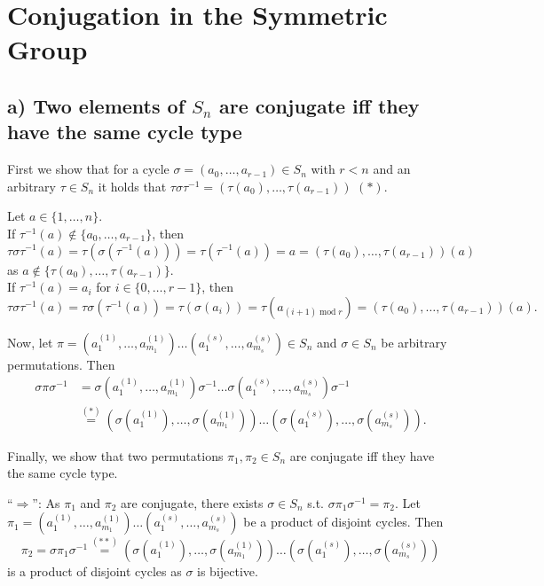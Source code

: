 \section{Conjugation in the Symmetric Group}

\subsection*{a) Two elements of $S_n$ are conjugate iff they have the same cycle type}
First we show that for a cycle $\sigma = (a_0, \dots, a_{r-1}) \in S_n$ with $r < n$ and an arbitrary $\tau \in S_n$ it holds that $\tau \sigma \tau^{-1} = (\tau(a_0), \dots, \tau(a_{r-1}))$ $(\ast)$.

Let $a \in \{1, \dots, n\}$.\\
If $\tau^{-1}(a) \notin \{a_0, \dots, a_{r-1}\}$, then 
\[ \tau \sigma \tau^{-1}(a) = \tau(\sigma (\tau^{-1}(a))) = \tau(\tau^{-1}(a)) = a = (\tau(a_0), \dots, \tau(a_{r-1}))(a) \] 
as $a \notin \{\tau(a_0), \dots, \tau(a_{r-1})\}$.\\
If $\tau^{-1}(a) = a_i$ for $i \in \{0, \dots, r-1\}$, then
\[ \tau \sigma \tau^{-1}(a) = \tau \sigma(\tau^{-1}(a)) = \tau(\sigma(a_i)) = \tau(a_{(i+1) \operatorname{mod} r}) = (\tau(a_0), \dots, \tau(a_{r-1}))(a). \]

Now, let $\pi = (a_1^{(1)}, \dots, a_{m_1}^{(1)}) \dots (a_1^{(s)}, \dots, a_{m_s}^{(s)}) \in S_n$ and $\sigma \in S_n$ be arbitrary permutations. Then
\begin{equation} \tag{$\ast \ast$}
\begin{split}
\sigma \pi \sigma^{-1} & = \sigma (a_1^{(1)}, \dots, a_{m_1}^{(1)}) \sigma^{-1} \dots \sigma (a_1^{(s)}, \dots, a_{m_s}^{(s)}) \sigma^{-1} \\
& \stackrel{(\ast)}{=} (\sigma(a_1^{(1)}), \dots, \sigma(a_{m_1}^{(1)})) \dots (\sigma(a_1^{(s)}), \dots, \sigma(a_{m_s}^{(s)})).
\end{split}
\end{equation}

Finally, we show that two permutations $\pi_1, \pi_2 \in S_n$ are conjugate iff they have the same cycle type.

``$\Rightarrow$'': As $\pi_1$ and $\pi_2$ are conjugate, there exists $\sigma \in S_n$ s.t. $\sigma \pi_1 \sigma^{-1} = \pi_2$. Let $\pi_1 =  (a_1^{(1)}, \dots, a_{m_1}^{(1)}) \dots (a_1^{(s)}, \dots, a_{m_s}^{(s)})$ be a product of disjoint cycles. Then
\[ \pi_2 = \sigma \pi_1 \sigma^{-1} \stackrel{(\ast \ast)}{=} (\sigma(a_1^{(1)}), \dots, \sigma(a_{m_1}^{(1)})) \dots (\sigma(a_1^{(s)}), \dots, \sigma(a_{m_s}^{(s)})) \]
is a product of disjoint cycles as $\sigma$ is bijective.

